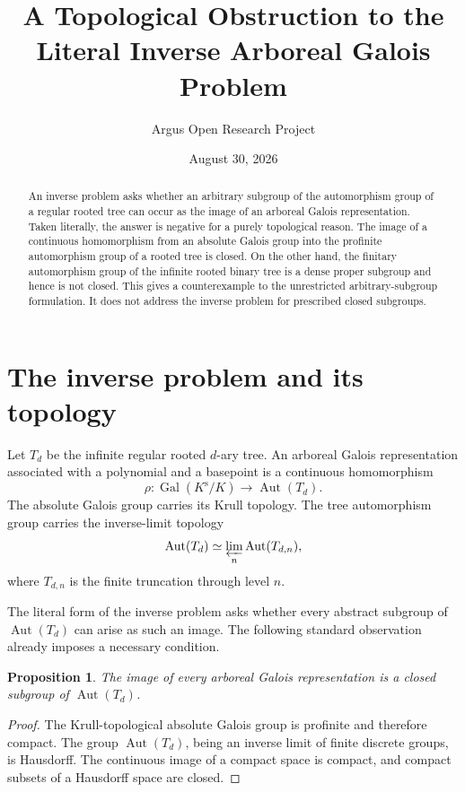 \documentclass[10pt,reqno]{amsart}
\title[A topological obstruction to an inverse arboreal problem]
{A Topological Obstruction to the Literal Inverse Arboreal Galois Problem}
\author{Argus Open Research Project}
\date{August 30, 2026}
\newtheorem{proposition}[theorem]{Proposition}
\theoremstyle{definition}
\begin{document}
\begin{abstract}
An inverse problem asks whether an arbitrary subgroup of the automorphism
group of a regular rooted tree can occur as the image of an arboreal Galois
representation.  Taken literally, the answer is negative for a purely
topological reason.  The image of a continuous homomorphism from an absolute
Galois group into the profinite automorphism group of a rooted tree is closed.
On the other hand, the finitary automorphism group of the infinite rooted
binary tree is a dense proper subgroup and hence is not closed.  This gives a
counterexample to the unrestricted arbitrary-subgroup formulation.  It does
not address the inverse problem for prescribed closed subgroups.
\end{abstract}

\maketitle

\section{The inverse problem and its topology}

Let \(T_d\) be the infinite regular rooted \(d\)-ary tree.  An arboreal
Galois representation associated with a polynomial and a basepoint is a
continuous homomorphism
\[
 \rho:\operatorname{Gal}(K^{\mathrm s}/K)
 \longrightarrow \operatorname{Aut}(T_d).
\]
The absolute Galois group carries its Krull topology.  The tree automorphism
group carries the inverse-limit topology
\[
 \operatorname{Aut}(T_d)
 \simeq \varprojlim_n \operatorname{Aut}(T_{d,n}),
\]
where \(T_{d,n}\) is the finite truncation through level \(n\).

The literal form of the inverse problem asks whether every abstract subgroup
of \(\operatorname{Aut}(T_d)\) can arise as such an image.  The following
standard observation already imposes a necessary condition.

\begin{proposition}\label{prop:closed}
The image of every arboreal Galois representation is a closed subgroup of
\(\operatorname{Aut}(T_d)\).
\end{proposition}

\begin{proof}
The Krull-topological absolute Galois group is profinite and therefore
compact.  The group \(\operatorname{Aut}(T_d)\), being an inverse limit of
finite discrete groups, is Hausdorff.  The continuous image of a compact
space is compact, and compact subsets of a Hausdorff space are closed.
\end{proof}
\end{document}
